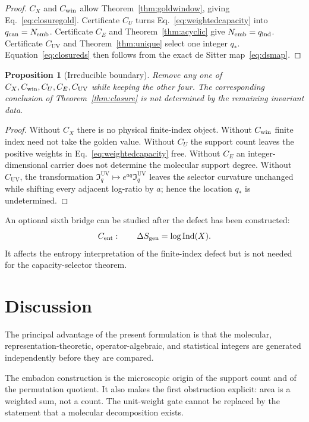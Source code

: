 \documentclass[aps,prd,preprint,nofootinbib,superscriptaddress]{revtex4-2}
\newtheorem{proposition}[theorem]{Proposition}
\theoremstyle{definition}
\theoremstyle{remark}
\newcommand{\Ind}{\operatorname{Ind}}
\newcommand{\UV}{\mathrm{UV}}
\newcommand{\cI}{\mathfrak I}
\begin{document}
\begin{proof}
$C_X$ and $C_{\rm win}$ allow Theorem~\ref{thm:goldwindow}, giving
Eq.~\eqref{eq:closuregold}.  Certificate $C_U$ turns
Eq.~\eqref{eq:weightedcapacity} into $q_{\rm can}=N_{\rm emb}$.
Certificate $C_E$ and Theorem~\ref{thm:acyclic} give
$N_{\rm emb}=q_{\rm ind}$.  Certificate $C_{\UV}$ and
Theorem~\ref{thm:unique} select one integer $q_*$.  Equation~\eqref{eq:closureds}
then follows from the exact de Sitter map~\eqref{eq:dsmap}.
\end{proof}

\begin{proposition}[Irreducible boundary]
\label{prop:irreducible}
Remove any one of
$C_X,C_{\rm win},C_U,C_E,C_{\UV}$ while keeping the other four.  The
corresponding conclusion of Theorem~\ref{thm:closure} is not determined by
the remaining invariant data.
\end{proposition}

\begin{proof}
Without $C_X$ there is no physical finite-index object.  Without
$C_{\rm win}$ finite index need not take the golden value.  Without $C_U$ the
support count leaves the positive weights in
Eq.~\eqref{eq:weightedcapacity} free.  Without $C_E$ an integer-dimensional
carrier does not determine the molecular support degree.  Without $C_{\UV}$,
the transformation
$\cI_q^{\UV}\mapsto e^{aq}\cI_q^{\UV}$ leaves the selector curvature
unchanged while shifting every adjacent log-ratio by $a$; hence the location
$q_*$ is undetermined.
\end{proof}

An optional sixth bridge can be studied after the defect has been
constructed:
\begin{equation}
C_{\rm ent}:
\qquad
\Delta S_{\rm gen}=\log\Ind(X).
\label{eq:Cent}
\end{equation}
It affects the entropy interpretation of the finite-index defect but is not
needed for the capacity-selector theorem.

\section{Discussion}
\label{sec:discussion}

The principal advantage of the present formulation is that the molecular,
representation-theoretic, operator-algebraic, and statistical integers are
generated independently before they are compared.

The embadon construction is the microscopic origin of the support count and
of the permutation quotient.  It also makes the first obstruction explicit:
area is a weighted sum, not a count.  The unit-weight gate cannot be replaced
by the statement that a molecular decomposition exists.
\end{document}
